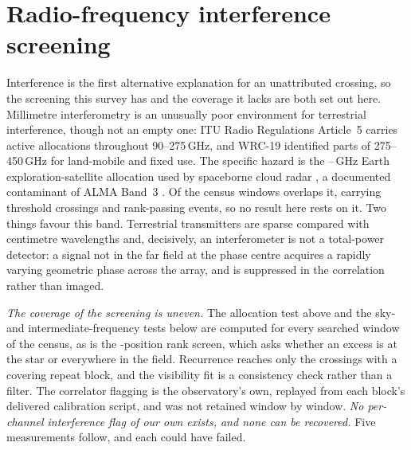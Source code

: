 \section{Radio-frequency interference screening}
\label{app:rfi}

Interference is the first alternative explanation for an unattributed
crossing, so the screening this survey has and the coverage it lacks are both
set out here. Millimetre interferometry is an unusually poor
environment for terrestrial interference, though not an empty one: ITU Radio
Regulations Article~5 \citep{ITU2024} carries active allocations throughout
90--275\,GHz, and WRC-19 identified parts of 275--450\,GHz for land-mobile and
fixed use. The specific hazard is the \RadarLo--\RadarHi\,GHz Earth
exploration-satellite allocation used by spaceborne cloud radar
\citep{CloudSat2002,EarthCARE2023}, a documented contaminant of ALMA Band~3
\citep{ALMAMemo504}. Of the \RadarNTot{} census windows \RadarNWin{} overlaps
it, carrying \RadarNCross{} threshold crossings and \RadarNStage{}
rank-passing events, so no result here rests on it. Two things favour this
band. Terrestrial transmitters are sparse compared with centimetre
wavelengths and, decisively, an interferometer is not a total-power detector: a signal not in the far
field at the phase centre acquires a rapidly varying geometric phase across
the array, and is suppressed in the correlation rather than imaged.

\emph{The coverage of the screening is uneven.} The allocation test above and
the sky- and intermediate-frequency tests below are computed for every
searched window of the census, as is the \NCtrl-position rank screen, which
asks whether an excess is at the star or everywhere in the field. Recurrence
reaches only the crossings with a covering repeat block, and the visibility
fit is a consistency check rather than a filter. The correlator flagging is
the observatory's own, replayed from each block's delivered calibration
script, and was not retained window by window. \emph{No per-channel
interference flag of our own exists, and none can be recovered.} Five
measurements follow, and each could have failed.

